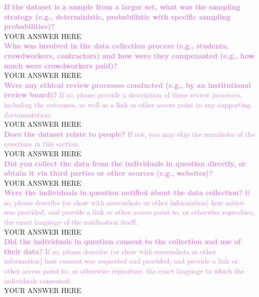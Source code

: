 \documentclass[letterpaper, 10 pt, conference]{ieeeconf}  %
\newcommand{\sectioncolor}{violet}
\begin{document}
    \textcolor{\sectioncolor}{\textbf{
    If the dataset is a sample from a larger set, what was the sampling
    strategy (e.g., deterministic, probabilistic with specific sampling
    probabilities)?
    }
    } \\
    YOUR ANSWER HERE \\
    
    \textcolor{\sectioncolor}{\textbf{
    Who was involved in the data collection process (e.g., students,
    crowdworkers, contractors) and how were they compensated (e.g., how much
    were crowdworkers paid)?
    }
    } \\
    YOUR ANSWER HERE \\
    
    \textcolor{\sectioncolor}{\textbf{
    Were any ethical review processes conducted (e.g., by an institutional
    review board)?
    }
    If so, please provide a description of these review processes, including
    the outcomes, as well as a link or other access point to any supporting
    documentation.
    } \\
    YOUR ANSWER HERE \\
    
    \textcolor{\sectioncolor}{\textbf{
    Does the dataset relate to people?
    }
    If not, you may skip the remainder of the questions in this section.
    } \\
    YOUR ANSWER HERE \\
    
    \textcolor{\sectioncolor}{\textbf{
    Did you collect the data from the individuals in question directly, or
    obtain it via third parties or other sources (e.g., websites)?
    }
    } \\
    YOUR ANSWER HERE \\
    
    \textcolor{\sectioncolor}{\textbf{
    Were the individuals in question notified about the data collection?
    }
    If so, please describe (or show with screenshots or other information) how
    notice was provided, and provide a link or other access point to, or
    otherwise reproduce, the exact language of the notification itself.
    } \\
    YOUR ANSWER HERE \\
    
    \textcolor{\sectioncolor}{\textbf{
    Did the individuals in question consent to the collection and use of their
    data?
    }
    If so, please describe (or show with screenshots or other information) how
    consent was requested and provided, and provide a link or other access
    point to, or otherwise reproduce, the exact language to which the
    individuals consented.
    } \\
    YOUR ANSWER HERE \\
    
\end{document}
